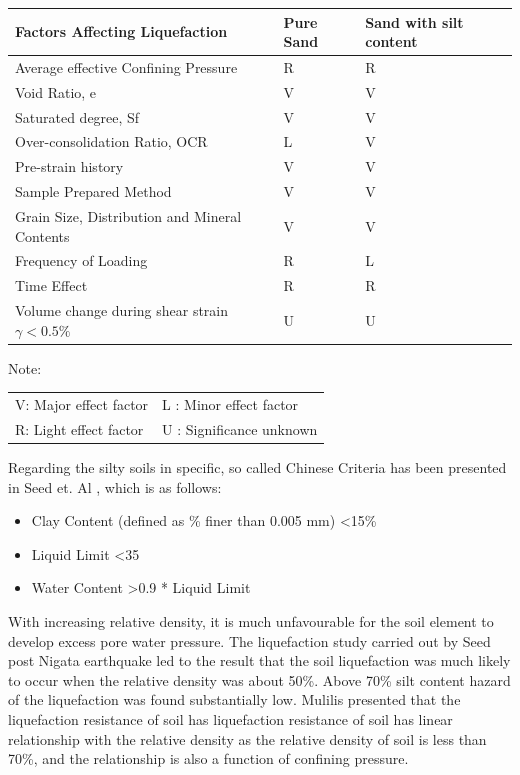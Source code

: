 \begin{tabularx}{\textwidth}{ |X|X|X| }
\hline
Factors Affecting Liquefaction & Pure Sand & Sand with silt content \\
\hline
Average effective Confining Pressure & R & R \\
\hline
Void Ratio, e & V & V \\
\hline
Saturated degree, Sf & V & V \\
\hline
Over-consolidation Ratio, OCR & L & V\\
\hline
Pre-strain history & V & V\\
\hline
Sample Prepared Method & V & V\\
\hline
Grain Size, Distribution and Mineral Contents & V & V \\
\hline
Frequency of Loading & R & L \\
\hline
Time Effect & R & R \\
\hline
Volume change during shear strain \(\gamma < 0.5 \%\) & U & U \\
\hline
\end{tabularx}

Note:
\begin{tabular}{l l}
V: Major effect factor & L : Minor effect factor\\
R: Light effect factor & U : Significance unknown
\end{tabular}

Regarding the silty soils in specific, so called Chinese Criteria \cite{r20} has been presented in Seed et. Al \cite{r12} , which is as follows:

\begin{itemize}
\item Clay Content (defined as \% finer than 0.005 mm) \textless 15\%
\item Liquid Limit \textless  35
\item Water Content \textgreater 0.9 * Liquid Limit
\end{itemize}

With increasing relative density, it is much unfavourable for the soil element to develop excess pore water pressure. The liquefaction study carried out by Seed \cite{r14} post Nigata earthquake led to the result that the soil liquefaction was much likely to occur when the relative density was about 50\%. Above 70\% silt content hazard of the liquefaction was found substantially low. Mulilis \cite{r15} presented that the liquefaction resistance of soil has liquefaction resistance of soil has linear relationship with the relative density as the relative density of soil is less than 70\%, and the relationship is also a function of confining pressure.

